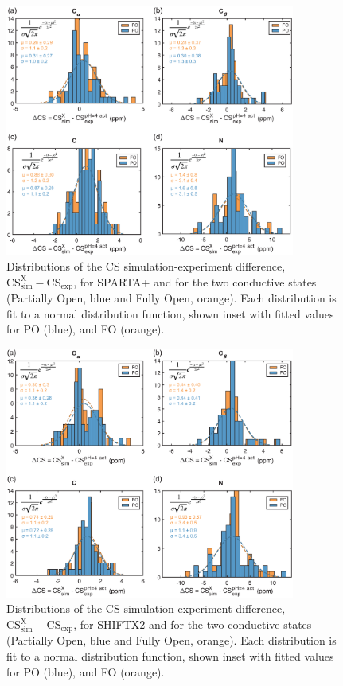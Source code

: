 \documentclass[%
 aip,
 amsmath,amssymb,
 preprint,%
]{revtex4-1}
\begin{document}
\begin{figure}[tbp]
	\includegraphics[width=0.85\textwidth]{figures_SI/SPARTA_histograms-01.eps}
	 \caption{\scriptsize
Distributions of the CS simulation-experiment difference, $\text{CS}_{\text{sim}}^{\text{X}}-\text{CS}_{\text{exp}}$, for SPARTA+ and for the two conductive states (Partially Open, blue and Fully Open, orange). Each distribution is fit to a normal distribution function, shown inset with fitted values for PO (blue), and FO (orange).
}
\label{SI_sparta_histogram}
\end{figure}
\clearpage

\begin{figure}[tbp]
	\includegraphics[width=0.85\textwidth]{figures_SI/SHIFTX2_histograms-02.eps}
	 \caption{\scriptsize
Distributions of the CS simulation-experiment difference, $\text{CS}_{\text{sim}}^{\text{X}}-\text{CS}_{\text{exp}}$, for SHIFTX2 and for the two conductive states (Partially Open, blue and Fully Open, orange). Each distribution is fit to a normal distribution function, shown inset with fitted values for PO (blue), and FO (orange).
}
\label{SI_shiftx2_histogram}
\end{figure}
\clearpage
\end{document}
